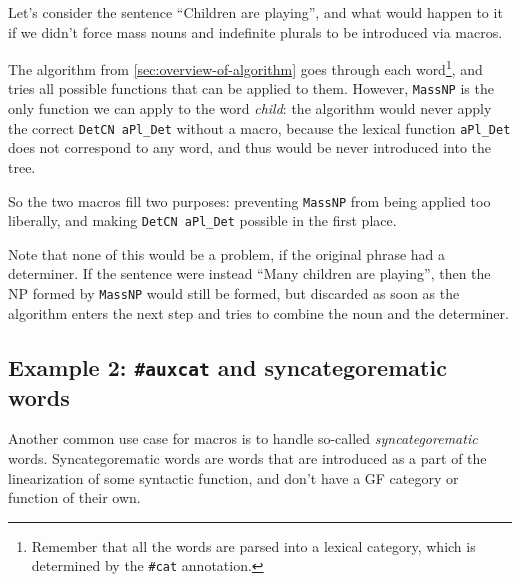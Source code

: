 Let's consider the sentence ``Children are playing'', and what would happen to it if we didn't force mass nouns and indefinite plurals to be introduced via macros.

The algorithm from \autoref{sec:overview-of-algorithm} goes through each word\footnote{Remember that all the words are parsed into a lexical category, which is determined by the \texttt{\#cat} annotation.}, and tries all possible functions that can be applied to them.
However, \verb|MassNP| is the only function we can apply to the word \emph{child}: the algorithm would never apply the correct \verb|DetCN aPl_Det| without a macro, because the lexical function \verb|aPl_Det| does not correspond to any word, and thus would be never introduced into the tree.

So the two macros fill two purposes: preventing \verb|MassNP| from being applied too liberally, and making \verb|DetCN aPl_Det| possible in the first place.

Note that none of this would be a problem, if the original phrase had a determiner. If the sentence were instead ``Many children are playing'', then the NP formed by \verb|MassNP| would still be formed, but discarded as soon as the algorithm enters the next step and tries to combine the noun and the determiner.


\subsection{Example 2: \texttt{\#auxcat} and syncategorematic words}

Another common use case for macros is to handle so-called \emph{syncategorematic} words.
Syncategorematic words are words that are introduced as a part of the linearization of some syntactic function, and don't have a GF category or function of their own.


